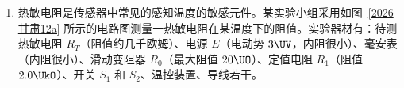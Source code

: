 \documentclass[\gkver]{gaokaozhenti}
\begin{document}
\begin{enumerate}
{\begin{enumerate}
	C．为了保证每次碰撞前瞬间入射小球的速度相同，每次应从同一位置静止释放入射小球，但斜槽轨道表面不需要光滑，故 C 错误；

	D．为了保证小球抛出时的速度处于水平方向，斜槽轨道末端应调节至水平，故 D 正确。故选 BD。
	\item
	设碰撞前瞬间入射小球的速度为 $v_{0}$，碰撞后瞬间入射小球和被碰小球的速度分别为 $v_{1}$、$v_{2}$；根据动量守恒可得 $m_{1}v_{0} = m_{1}v_{1} + m_{2}v_{2}$

	由于两小球在空中下落高度相同，运动时间相等，则有 $v_{0} = \frac{OA}{t}$，$v_{1} = \frac{OB}{t}$，$v_{2} = \frac{OC}{t}$

	联立可得 $m_{1} \cdot OA = m_{1} \cdot OB + m_{2} \cdot OC$

	整理可得 $\frac{OA - OB}{OC} = \frac{1}{m_{1}}m_{2}$

	则以 $m_{2}$ 为横坐标，以 $\frac{OA - OB}{OC}$ 为纵坐标描点，若这些点都近似在一条直线上，则说明动量守恒定律成立。故选 A。
	\item
	若 $m_{1} = 3m_{2}$，且碰撞近似为弹性碰撞，根据动量守恒和机械能守恒可得

	$m_{1}v_{0} = m_{1}v_{1} + m_{2}v_{2}$，$\frac{1}{2}m_{1}v_{0}^{2} = \frac{1}{2}m_{1}v_{1}^{2} + \frac{1}{2}m_{2}v_{2}^{2}$

	联立可得 $v_{1} = \frac{m_{1} - m_{2}}{m_{1} + m_{2}}v_{0}$

	又 $v_{0} = \frac{OA}{t}$，$v_{1} = \frac{OB}{t}$，可得 $\frac{OA}{OB} = \frac{m_{1} + m_{2}}{m_{1} - m_{2}} = 2$
\end{enumerate}
}

\item
热敏电阻是传感器中常见的感知温度的敏感元件。某实验小组采用如图~\ref{2026甘肃12a} 所示的电路图测量一热敏电阻在某温度下的阻值。实验器材有：待测热敏电阻 $R_{T}$（阻值约几千欧姆）、电源 $E$（电动势 $3\UV$，内阻很小）、毫安表（内阻很小）、滑动变阻器 $R_{0}$（最大阻值 $20\UO$）、定值电阻 $R_{1}$（阻值 $2.0\UkO$）、开关 $S_{1}$ 和 $S_{2}$、温控装置、导线若干。


\end{enumerate}
\end{document}
